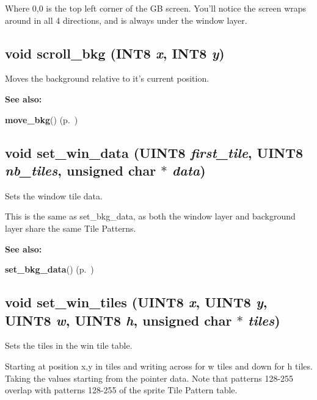 Where 0,0 is the top left corner of the GB screen. You'll notice the screen wraps around in all 4 directions, and is always under the window layer. \label{gb.h_a82}
\subsection{\setlength{\rightskip}{0pt plus 5cm}void scroll\_\-bkg ({\bf INT8} {\em x}, {\bf INT8} {\em y})}

Moves the background relative to it's current position.

\begin{Desc}
\item[{\bf See also: }]\par
{\bf move\_\-bkg}() {\rm (p.~\pageref{gb.h_a81})} \end{Desc}
\label{gb.h_a83}
\subsection{\setlength{\rightskip}{0pt plus 5cm}void set\_\-win\_\-data ({\bf UINT8} {\em first\_\-tile}, {\bf UINT8} {\em nb\_\-tiles}, unsigned char $\ast$ {\em data})}

Sets the window tile data.

This is the same as set\_\-bkg\_\-data, as both the window layer and background layer share the same Tile Patterns. \begin{Desc}
\item[{\bf See also: }]\par
{\bf set\_\-bkg\_\-data}() {\rm (p.~\pageref{gb.h_a78})} \end{Desc}
\label{gb.h_a84}
\subsection{\setlength{\rightskip}{0pt plus 5cm}void set\_\-win\_\-tiles ({\bf UINT8} {\em x}, {\bf UINT8} {\em y}, {\bf UINT8} {\em w}, {\bf UINT8} {\em h}, unsigned char $\ast$ {\em tiles})}

Sets the tiles in the win tile table.

Starting at position x,y in tiles and writing across for w tiles and down for h tiles. Taking the values starting from the pointer data. Note that patterns 128-255 overlap with patterns 128-255 of the sprite Tile Pattern table.

